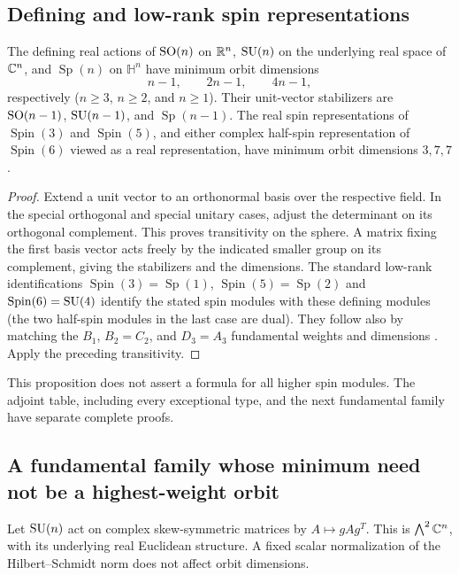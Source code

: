 \subsection{Defining and low-rank spin representations}
\begin{proposition}\label{prop:standard41}
The defining real actions of $\operatorname{SO}(n)$ on $\mathbb R^n$, $\operatorname{SU}(n)$ on the
underlying real space of $\mathbb C^n$, and $\operatorname{Sp}(n)$ on
$\mathbb H^n$ have minimum orbit dimensions
\[
 n-1,\qquad 2n-1,\qquad 4n-1,
\]
respectively ($n\ge3$, $n\ge2$, and $n\ge1$). Their unit-vector
stabilizers are $\operatorname{SO}(n-1)$, $\operatorname{SU}(n-1)$, and
$\operatorname{Sp}(n-1)$. The real spin representations of
$\operatorname{Spin}(3)$ and $\operatorname{Spin}(5)$, and either
complex half-spin representation of $\operatorname{Spin}(6)$ viewed
as a real representation, have minimum orbit dimensions $3,7,7$.
\end{proposition}
\begin{proof}
Extend a unit vector to an orthonormal basis over the respective
field. In the special orthogonal and special unitary cases, adjust
the determinant on its orthogonal complement. This proves transitivity
on the sphere. A matrix fixing the first basis vector acts freely by
the indicated smaller group on its complement, giving the stabilizers
and the dimensions.
The standard low-rank identifications
$\operatorname{Spin}(3)=\operatorname{Sp}(1)$,
$\operatorname{Spin}(5)=\operatorname{Sp}(2)$ and
$\operatorname{Spin}(6)=\operatorname{SU}(4)$ identify the stated spin modules with
these defining modules (the two half-spin modules in the last case are
dual). They follow also by matching the $B_1$, $B_2=C_2$, and
$D_3=A_3$ fundamental weights and dimensions
\cite[Sections 30--32]{Etingof}. Apply the preceding transitivity.
\end{proof}
This proposition does not assert a formula for all higher spin modules.
The adjoint table, including every exceptional type, and the next
fundamental family have separate complete proofs.

\subsection{A fundamental family whose minimum need not be a highest-weight orbit}
Let $\operatorname{SU}(n)$ act on complex skew-symmetric matrices by
$A\mapsto gAg^T$. This is $\bigwedge^2\mathbb C^n$, with its underlying
real Euclidean structure. A fixed scalar normalization of the
Hilbert--Schmidt norm does not affect orbit dimensions.

